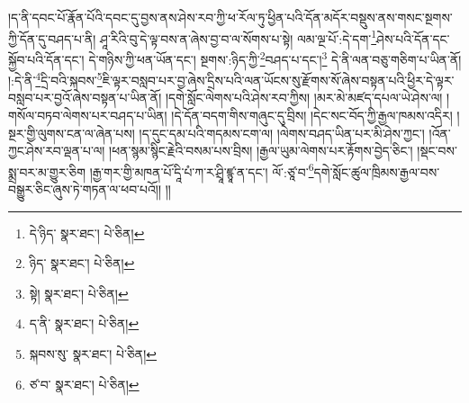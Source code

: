 །ད་ནི་དབང་པོ་རྣོན་པོའི་དབང་དུ་བྱས་ནས་ཤེས་རབ་ཀྱི་ཕ་རོལ་ཏུ་ཕྱིན་པའི་དོན་མདོར་བསྡུས་ནས་གསང་སྔགས་ཀྱི་དོན་དུ་བཤད་པ་ནི། ཤཱ་རིའི་བུ་དེ་ལྟ་བས་ན་ཞེས་བྱ་བ་ལ་སོགས་པ་སྟེ། ལམ་ལྔ་པོ་:དེ་དག་\footnote{དེ་ཉིད་  སྣར་ཐང་།  པེ་ཅིན། }ཤེས་པའི་དོན་དང་སྐྱོབ་པའི་དོན་དང་། དེ་གཉིས་ཀྱི་ཕན་ཡོན་དང་། སྔགས་:ཉིད་ཀྱི་\footnote{ཉིད་  སྣར་ཐང་།  པེ་ཅིན། }བཤད་པ་དང་།\footnote{སྟེ།  སྣར་ཐང་།  པེ་ཅིན། } དེ་ནི་ལན་བཅུ་གཅིག་པ་ཡིན་ནོ། །:དེ་ནི་\footnote{ད་ནི་  སྣར་ཐང་།  པེ་ཅིན། }དྲི་བའི་སྐབས་\footnote{སྐབས་སུ་  སྣར་ཐང་།  པེ་ཅིན། }ཇི་ལྟར་བསླབ་པར་བྱ་ཞེས་དྲིས་པའི་ལན་ཡོངས་སུ་རྫོགས་སོ་ཞེས་བསྟན་པའི་ཕྱིར་དེ་ལྟར་བསླབ་པར་བྱའོ་ཞེས་བསྟན་པ་ཡིན་ནོ། །དགེ་སློང་ལེགས་པའི་ཤེས་རབ་ཀྱིས། །མར་མེ་མཛད་དཔལ་ཡེ་ཤེས་ལ། །གསོལ་བཏབ་ལེགས་པར་བཤད་པ་ཡིན། །དེ་དོན་བདག་གིས་གཞུང་དུ་བྲིས། །དེང་སང་བོད་ཀྱི་རྒྱལ་ཁམས་འདིར། །སྔར་གྱི་ལུགས་ངན་ལ་ཞེན་པས། །ད་དུང་དམ་པའི་གདམས་ངག་ལ། །ལེགས་བཤད་ཡིན་པར་མི་ཤེས་ཀྱང་། །འོན་ཀྱང་ཤེས་རབ་ལྡན་པ་ལ། །ཕན་སྙམ་སྙིང་རྗེའི་བསམ་པས་བྲིས། །རྒྱལ་ཡུམ་ལེགས་པར་རྟོགས་བྱེད་ཅིང་། །སྡང་བས་སྨྲ་བར་མ་གྱུར་ཅིག །རྒྱ་གར་གྱི་མཁན་པོ་དཱི་པཾ་ཀ་ར་ཤྲཱི་ཛྙཱ་ན་དང་། ལོ་:ཙཱ་བ་\footnote{ཙ་བ་  སྣར་ཐང་།  པེ་ཅིན། }དགེ་སློང་ཚུལ་ཁྲིམས་རྒྱལ་བས་བསྒྱུར་ཅིང་ཞུས་ཏེ་གཏན་ལ་ཕབ་པའོ།། །།